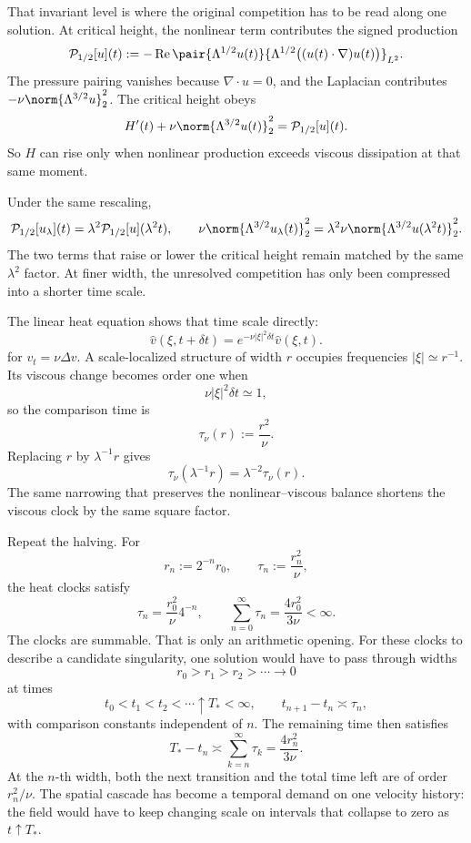 
That invariant level is where the original competition has to be read along one solution. At critical height, the nonlinear term contributes the signed production
\[
  \mathcal P_{1/2}[u](t)
  :=
  -\operatorname{Re}
  \pair
    {\Lambda^{1/2}u(t)}
    {\Lambda^{1/2}\bigl((u(t)\cdot\nabla)u(t)\bigr)}_{L^2}.
\]
The pressure pairing vanishes because \(\nabla\cdot u=0\), and the Laplacian contributes \(-\nu\norm{\Lambda^{3/2}u}_2^2\). The critical height obeys
\[
  H'(t)
  +
  \nu\norm{\Lambda^{3/2}u(t)}_2^2
  =
  \mathcal P_{1/2}[u](t).
\]
So \(H\) can rise only when nonlinear production exceeds viscous dissipation at that same moment.

Under the same rescaling,
\[
  \mathcal P_{1/2}[u_\lambda](t)
  =
  \lambda^2\mathcal P_{1/2}[u](\lambda^2t),
  \qquad
  \nu\norm{\Lambda^{3/2}u_\lambda(t)}_2^2
  =
  \lambda^2\nu\norm{\Lambda^{3/2}u(\lambda^2t)}_2^2.
\]
The two terms that raise or lower the critical height remain matched by the same \(\lambda^2\) factor. At finer width, the unresolved competition has only been compressed into a shorter time scale.


The linear heat equation shows that time scale directly:
\[
  \widehat v(\xi,t+\delta t)
  =
  e^{-\nu|\xi|^2\delta t}\widehat v(\xi,t).
\]
for \(v_t=\nu\Delta v\). A scale-localized structure of width \(r\) occupies frequencies \(|\xi|\simeq r^{-1}\). Its viscous change becomes order one when
\[
  \nu|\xi|^2\delta t\simeq1,
\]
so the comparison time is
\[
  \tau_\nu(r)
  :=
  \frac{r^2}{\nu}.
\]
Replacing \(r\) by \(\lambda^{-1}r\) gives
\[
  \tau_\nu(\lambda^{-1}r)
  =
  \lambda^{-2}\tau_\nu(r).
\]
The same narrowing that preserves the nonlinear--viscous balance shortens the viscous clock by the same square factor.


Repeat the halving. For
\[
  r_n:=2^{-n}r_0,
  \qquad
  \tau_n:=\frac{r_n^2}{\nu},
\]
the heat clocks satisfy
\[
  \tau_n
  =
  \frac{r_0^2}{\nu}4^{-n},
  \qquad
  \sum_{n=0}^{\infty}\tau_n
  =
  \frac{4r_0^2}{3\nu}
  <
  \infty.
\]
The clocks are summable. That is only an arithmetic opening. For these clocks to describe a candidate singularity, one \NavierStokes{} solution would have to pass through widths
\[
  r_0>r_1>r_2>\cdots\longrightarrow0
\]
at times
\[
  t_0<t_1<t_2<\cdots\uparrow T_*<\infty,
  \qquad
  t_{n+1}-t_n\asymp\tau_n,
\]
with comparison constants independent of \(n\). The remaining time then satisfies
\[
  T_*-t_n
  \asymp
  \sum_{k=n}^{\infty}\tau_k
  =
  \frac{4r_n^2}{3\nu}.
\]
At the \(n\)-th width, both the next transition and the total time left are of order \(r_n^2/\nu\). The spatial cascade has become a temporal demand on one velocity history: the field would have to keep changing scale on intervals that collapse to zero as \(t\uparrow T_*\).